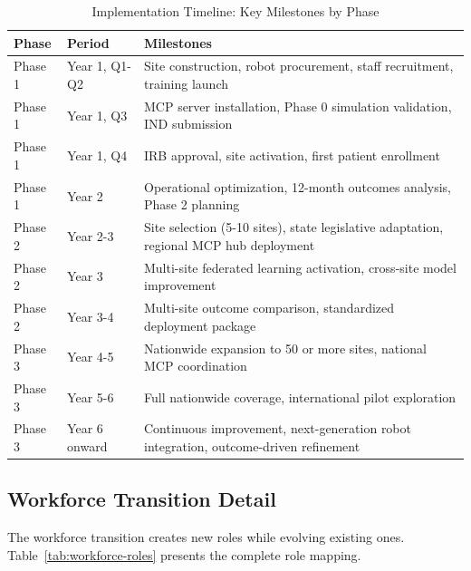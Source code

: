 \begin{table}[H]
\centering
\caption{Implementation Timeline: Key Milestones by Phase}
\label{tab:impl-timeline}
\small
\begin{tabularx}{\textwidth}{l l X}
\toprule
\textbf{Phase} & \textbf{Period} & \textbf{Milestones} \\
\midrule
Phase 1 & Year 1, Q1-Q2 & Site construction, robot procurement, staff recruitment, training launch \\
Phase 1 & Year 1, Q3 & MCP server installation, Phase 0 simulation validation, IND submission \\
Phase 1 & Year 1, Q4 & IRB approval, site activation, first patient enrollment \\
Phase 1 & Year 2 & Operational optimization, 12-month outcomes analysis, Phase 2 planning \\
\midrule
Phase 2 & Year 2-3 & Site selection (5-10 sites), state legislative adaptation, regional MCP hub deployment \\
Phase 2 & Year 3 & Multi-site federated learning activation, cross-site model improvement \\
Phase 2 & Year 3-4 & Multi-site outcome comparison, standardized deployment package  \\
\midrule
Phase 3 & Year 4-5 & Nationwide expansion to 50 or more sites, national MCP coordination \\
Phase 3 & Year 5-6 & Full nationwide coverage, international pilot exploration \\
Phase 3 & Year 6 onward & Continuous improvement, next-generation robot integration, outcome-driven refinement \\
\bottomrule
\end{tabularx}
\end{table}

\subsection{Workforce Transition Detail}
\label{subsec:impl-workforce-detail}

The workforce transition creates new roles while evolving existing ones.
Table~\ref{tab:workforce-roles} presents the complete role mapping.

\clearpage

